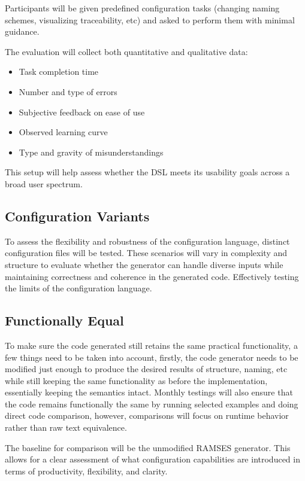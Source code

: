 Participants will be given predefined configuration tasks (changing naming schemes, visualizing traceability, etc) and asked to perform them with minimal guidance.

The evaluation will collect both quantitative and qualitative data:
\begin{itemize}
	\item Task completion time
	\item Number and type of errors
	\item Subjective feedback on ease of use
	\item Observed learning curve
	\item Type and gravity of misunderstandings
\end{itemize}

This setup will help assess whether the DSL meets its usability goals across a broad user spectrum.

\subsection*{Configuration Variants}

To assess the flexibility and robustness of the configuration language, distinct configuration files will be tested. These scenarios will vary in complexity and structure to evaluate whether the generator can handle diverse inputs while maintaining correctness and coherence in the generated code. Effectively testing the limits of the configuration language.

\subsection*{Functionally Equal}

To make sure the code generated still retains the same practical functionality, a few things need to be taken into account, firstly, the code generator needs to be modified just enough to produce the desired results of structure, naming, etc while still keeping the same functionality as before the implementation, essentially keeping the semantics intact. Monthly testings will also ensure that the code remains functionally the same by running selected examples and doing direct code comparison, however, comparisons will focus on runtime behavior rather than raw text equivalence. 


The baseline for comparison will be the unmodified RAMSES generator. This allows for a clear assessment of what configuration capabilities are introduced in terms of productivity, flexibility, and clarity.


